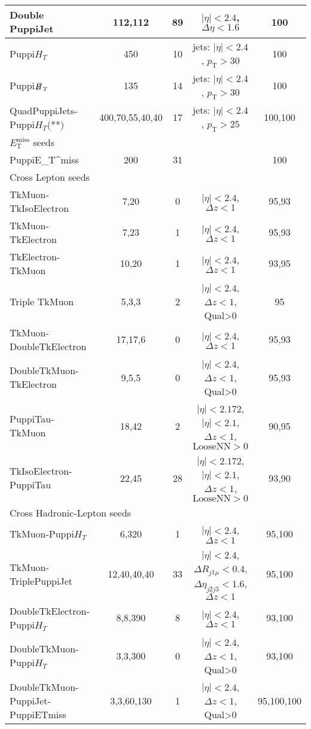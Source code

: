 \documentclass{article}
\newcommand{\pt}{\ensuremath{p_{\mathrm{T}}}\xspace}
\newcommand{\HT}{\ensuremath{H_{T}}\xspace}
\newcommand{\ETm}{\ensuremath{E_{\mathrm{T}}^{\text{miss}}}\xspace}
\newcommand{\ETmiss}{\ETm}
\begin{document}
\begin{table}[th]
\begin{adjustbox}{width=\textwidth}
{\begin{tabular}	{|l|c|c|c|c|}
\hline Double PuppiJet & 112,112 & 89 & $|\eta|<2.4$, ${\Delta}\eta <1.6$ & 100\\
\hline Puppi\HT & 450 & 10 & jets: $|\eta|<2.4$, $\pt >30$ & 100\\
\hline Puppi$\slashed{\ensuremath{H}}_{\mathrm{T}}$ & 135 & 14 & jets: $|\eta|<2.4$, $\pt >30$ & 100\\
\hline QuadPuppiJets-Puppi\HT(**) & 400,70,55,40,40 & 17 & jets: $|\eta|<2.4$, $\pt >25$ & 100,100\\
\hline
\hline \multicolumn{5}{|l|}{\ETmiss seeds} \\
\hline PuppiE_{T}^{miss} & 200 & 31 &  & 100\\
\hline
\hline \multicolumn{5}{|l|}{Cross Lepton seeds} \\
\hline TkMuon-TkIsoElectron & 7,20 & 0 & $|\eta|<2.4$, ${\Delta}z <1$ & 95,93\\
\hline TkMuon-TkElectron & 7,23 & 1 & $|\eta|<2.4$, ${\Delta}z <1$ & 95,93\\
\hline \color{black}TkElectron-TkMuon & 10,20 & 1 & $|\eta|<2.4$, ${\Delta}z <1$ & 93,95\\
\hline Triple TkMuon & 5,3,3 & 2 & $|\eta|<2.4$, ${\Delta}z <1$, Qual>0 & 95\\
\hline TkMuon-DoubleTkElectron & 17,17,6 & 0 & $|\eta|<2.4$, ${\Delta}z <1$ & 95,93\\
\hline DoubleTkMuon-TkElectron & 9,5,5 & 0 & $|\eta|<2.4$, ${\Delta}z <1$, Qual>0 & 95,93\\
\hline PuppiTau-TkMuon & 18,42 & 2 &  $|\eta|<2.172$, $|\eta|<2.1$, ${\Delta}z <1$, $\text{LooseNN} > 0$ & 90,95\\
\hline TkIsoElectron-PuppiTau & 22,45 & 28 & $|\eta|<2.172$, $|\eta|<2.1$, ${\Delta}z <1$, $\text{LooseNN} > 0$ & 93,90\\
\hline
\hline \multicolumn{5}{|l|}{Cross Hadronic-Lepton seeds} \\
\hline TkMuon-Puppi\HT & 6,320 & 1 & $|\eta|<2.4$, ${\Delta}z <1$ & 95,100\\
\hline TkMuon-TriplePuppiJet & 12,40,40,40 & 33 & $|\eta|<2.4$, ${\Delta}R_{j1\mu}<0.4$,${\Delta}\eta_{j2j3}<1.6$, ${\Delta}z <1$ & 95,100\\
\hline DoubleTkElectron-Puppi\HT & 8,8,390 & 8 & $|\eta|<2.4$, ${\Delta}z <1$ & 93,100\\
\hline DoubleTkMuon-Puppi\HT & 3,3,300 & 0 & $|\eta|<2.4$, ${\Delta}z <1$, Qual>0 & 93,100\\
\hline DoubleTkMuon-PuppiJet-PuppiETmiss & 3,3,60,130 & 1 & $|\eta|<2.4$, ${\Delta}z <1$, Qual>0 & 95,100,100\\

\end{tabular}}
\end{adjustbox}
\end{table}
\end{document}
